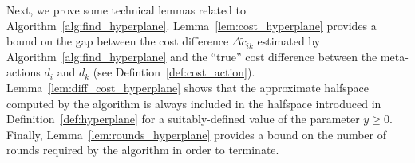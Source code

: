 Next, we prove some technical lemmas related to Algorithm~\ref{alg:find_hyperplane}.
%
Lemma~\ref{lem:cost_hyperplane} provides a bound on the gap between the cost difference $\Delta \widetilde{c}_{ik}$ estimated by Algorithm~\ref{alg:find_hyperplane} and the ``true'' cost difference between the meta-actions $d_i$ and $d_k$ (see Defintion~\ref{def:cost_action}).
%
%
Lemma~\ref{lem:diff_cost_hyperplane} shows that the approximate halfspace computed by the algorithm is always included in the halfspace introduced in Definition~\ref{def:hyperplane} for a suitably-defined value of the parameter $y \ge 0$.
%
Finally, Lemma~\ref{lem:rounds_hyperplane} provides a bound on the number of rounds required by the algorithm in order to terminate.


